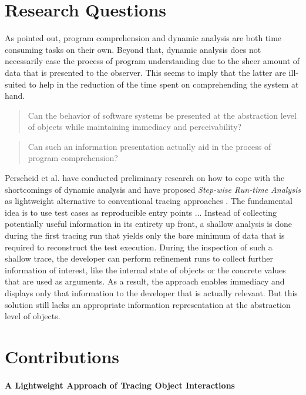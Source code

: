 \section{Research Questions}
As pointed out, program comprehension and dynamic analysis are both time consuming tasks on their own.
Beyond that, dynamic analysis does not necessarily ease the process of program understanding due to the sheer amount of data that is presented to the observer.
This seems to imply that the latter are ill-suited to help in the reduction of the time spent on comprehending the system at hand.


\begin{quote}
Can the behavior of software systems be presented at the abstraction level of objects while maintaining immediacy and perceivability?
\end{quote}
\begin{quote}
Can such an information presentation actually aid in the process of program comprehension?
\end{quote}

Perscheid et al. have conducted preliminary research on how to cope with the shortcomings of dynamic analysis and have proposed \emph{Step-wise Run-time Analysis} as lightweight alternative to conventional tracing approaches \cite{perscheid_immediacy_2010}.
The fundamental idea is to use test cases as reproducible entry points ...
Instead of collecting potentially useful information in its entirety up front, a shallow analysis is done during the first tracing run that yields only the bare minimum of data that is required to reconstruct the test execution.
During the inspection of such a shallow trace, the developer can perform refinement runs to collect further information of interest, like the internal state of objects or the concrete values that are used as arguments.
As a result, the approach enables immediacy and displays only that information to the developer that is actually relevant.
But this solution still lacks an appropriate information representation at the abstraction level of objects.



\section{Contributions}
\label{s:contributions}

\paragraph{A Lightweight Approach of Tracing Object Interactions}
